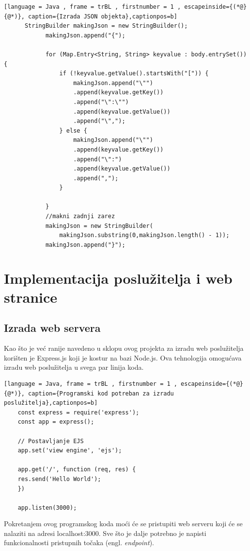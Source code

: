 \documentclass[times, utf8, zavrsni, numeric]{fer}
\begin{document}
	\renewcommand{\lstlistingname}{Kôd}
	\begin{lstlisting}[language = Java , frame = trBL , firstnumber = 1 , escapeinside={(*@}{@*)}, caption={Izrada JSON objekta},captionpos=b]
	  StringBuilder makingJson = new StringBuilder();
            makingJson.append("{");

            for (Map.Entry<String, String> keyvalue : body.entrySet()) {
                if (!keyvalue.getValue().startsWith("[")) {
                    makingJson.append("\"")
					.append(keyvalue.getKey())
					.append("\":\"")
					.append(keyvalue.getValue())
					.append("\",");
                } else {
                    makingJson.append("\"")
					.append(keyvalue.getKey())
					.append("\":")
					.append(keyvalue.getValue())
					.append(",");
                }

            }
            //makni zadnji zarez
            makingJson = new StringBuilder(
				makingJson.substring(0,makingJson.length() - 1));
            makingJson.append("}");
	\end{lstlisting}
	
	
\chapter{Implementacija poslužitelja i web stranice}
	\section{Izrada web servera}
	Kao što je već ranije navedeno u sklopu ovog projekta za izradu web poslužitelja korišten je Express.js koji je kostur na bazi Node.js. Ova tehnologija omogućava izradu web poslužitelja u svega par linija koda.
	\renewcommand{\lstlistingname}{Kôd}
	\begin{lstlisting}[language = Java, frame = trBL , firstnumber = 1 , escapeinside={(*@}{@*)}, caption={Programski kod potreban za izradu poslužitelja},captionpos=b]
	const express = require('express');
	const app = express();
 
	// Postavljanje EJS
	app.set('view engine', 'ejs');
 
	app.get('/', function (req, res) {
    res.send('Hello World');
	})

	app.listen(3000);
	\end{lstlisting}
	
	Pokretanjem ovog programskog koda moći će se pristupiti web serveru koji će se nalaziti na adresi localhost:3000. Sve što je dalje potrebno je napisti funkcionalnosti pristupnih točaka (engl. \textit{endpoint}).
\end{document}
